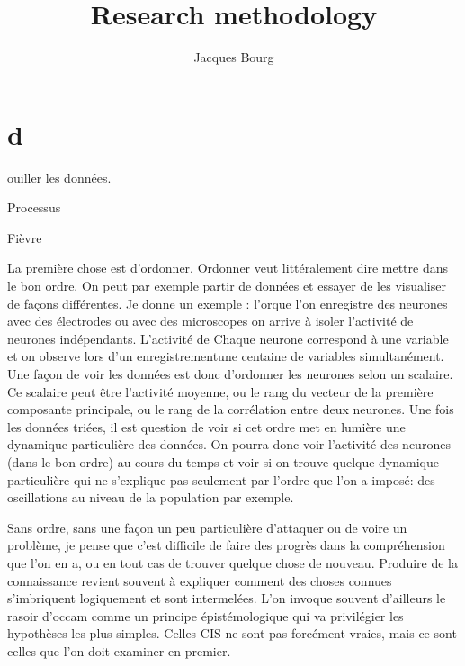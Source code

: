 \documentclass[24pt]{article}
\title{Research methodology}
\author{Jacques Bourg}
\begin{document}
\maketitle

\begin{abstract}

 
\end{abstract}




\section{ d}
 
        ouiller les données.


        Processus 

        Fièvre

        La première chose est d'ordonner. Ordonner veut littéralement dire mettre dans le bon ordre. On peut par exemple partir de données et essayer de les visualiser de façons différentes. Je donne un exemple : l'orque l'on enregistre des neurones avec des électrodes ou avec des microscopes on arrive à isoler l'activité de neurones indépendants. L'activité de Chaque neurone correspond à une variable et on observe lors d'un enregistrementune centaine de variables simultanément.  Une façon de voir les données est donc d'ordonner les neurones selon un scalaire. Ce scalaire peut être l'activité moyenne, ou le rang du vecteur de la première composante principale, ou le rang de la corrélation entre deux neurones. Une fois les données triées, il est question de voir si cet ordre met en lumière une dynamique particulière des données. On pourra donc voir l'activité des neurones (dans le bon ordre) au cours du temps et voir si on trouve quelque dynamique particulière qui ne s'explique pas seulement par l'ordre que l'on a imposé: des oscillations au niveau de la population par exemple. 

        Sans ordre, sans une façon un peu particulière d'attaquer ou de voire un problème, je pense que c'est difficile de faire des progrès dans la compréhension que l'on en a, ou en tout cas de trouver quelque chose de nouveau.    Produire de la connaissance revient souvent à expliquer comment des choses connues s'imbriquent logiquement et sont intermelées. L'on invoque souvent d'ailleurs le rasoir d'occam comme un principe épistémologique qui va privilégier les hypothèses les plus simples. Celles CIS ne sont pas forcément vraies, mais ce sont celles que l'on doit examiner en premier.
\end{document}
